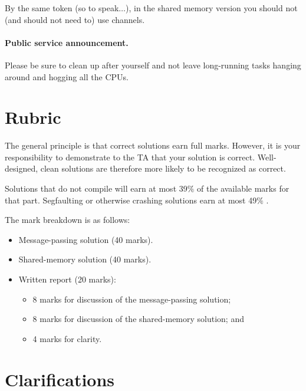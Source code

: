 \documentclass[12pt]{article}
\renewcommand{\_}{\kern-1.5pt\textunderscore\kern-1.5pt}
\begin{document}
\vspace*{1em} \noindent
By the same token (so to speak$ \ldots$), in the shared memory version you should not (and should not need to) use channels.\par

\paragraph{Public service announcement.}  Please be sure to clean up after yourself and not leave long-running tasks hanging around and hogging all the CPUs.

\section*{Rubric}
The general principle is that correct solutions earn full marks. However, it is your responsibility to demonstrate to the TA that your solution is correct. Well-designed, clean solutions are therefore more likely to be recognized as correct. \par

\vspace*{1em} \noindent
Solutions that do not compile will earn at most 39$\%$  of the available marks for that part. Segfaulting or otherwise crashing solutions earn at most 49$\%$ . 

\vspace*{1em} \noindent
The mark breakdown is as follows:
\begin{itemize}[noitemsep]
  \item Message-passing solution (40 marks).
  \item Shared-memory solution (40 marks).
  \item Written report (20 marks):
\begin{itemize}[noitemsep]
	\item 8 marks for discussion of the message-passing solution;

	\item 8 marks for discussion of the shared-memory solution; and

	\item 4 marks for clarity.
\end{itemize}
\end{itemize}

\section*{Clarifications}
\end{document}
